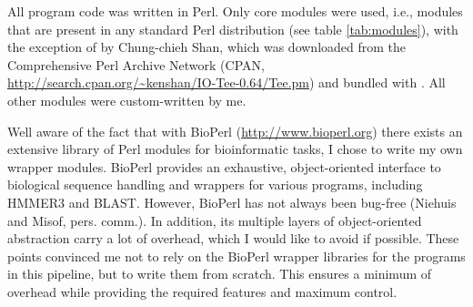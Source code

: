 All program code was written in Perl. Only core modules were used, i.e., modules
that are present in any standard Perl distribution (see table \ref{tab:modules}),
with the exception of  by Chung-chieh Shan, which was downloaded
from the Comprehensive Perl Archive Network (CPAN,
\url{http://search.cpan.org/~kenshan/IO-Tee-0.64/Tee.pm}) and bundled with
\pname. All other modules were custom-written by me.

Well aware of the fact that with BioPerl (\url{http://www.bioperl.org}) there
exists an extensive library of Perl modules for bioinformatic tasks, I chose to
write my own wrapper modules. BioPerl provides an exhaustive, object-oriented
interface to biological sequence handling and wrappers for various programs,
including HMMER3 and BLAST. However, BioPerl has not always been bug-free
(Niehuis and Misof, pers. comm.). In addition, its multiple layers of
object-oriented abstraction carry a lot of overhead, which I would like to avoid
if possible.  These points convinced me not to rely on the BioPerl wrapper
libraries for the programs in this pipeline, but to write them from scratch.
This ensures a minimum of overhead while providing the required features and
maximum control.


